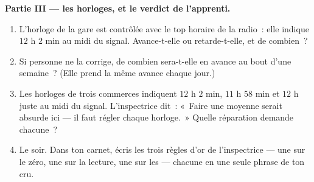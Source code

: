 \begin{problem}
\medskip\noindent\textbf{Partie III --- les horloges, et le verdict
de l'apprenti.}
\begin{enumerate}[resume]
  \item L'horloge de la gare est contrôlée avec le top horaire de
        la radio~: elle indique $12$ h $2$ min au midi du signal.
        Avance-t-elle ou retarde-t-elle, et de combien~?
  \item Si personne ne la corrige, de combien sera-t-elle en avance
        au bout d'une semaine~? (Elle prend la même avance chaque
        jour.)
  \item Les horloges de trois commerces indiquent $12$ h $2$ min,
        $11$ h $58$ min et $12$ h juste au midi du signal.
        L'inspectrice dit~: «~Faire une moyenne serait absurde ici
        --- il faut régler chaque horloge.~» Quelle réparation
        demande chacune~?
  \item Le soir. Dans ton carnet, écris les trois règles d'or de
        l'inspectrice --- une sur le zéro, une sur la lecture, une
        sur les  --- chacune en une seule phrase de ton cru.
\end{enumerate}
\end{problem}
